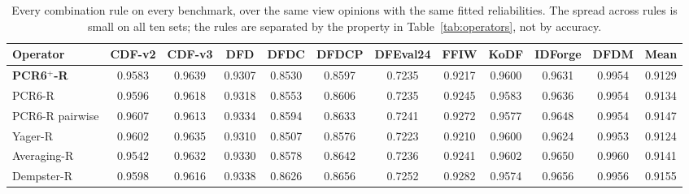\begin{table}[t]
\centering
\caption{Every combination rule on every benchmark, over the same view opinions with the same fitted reliabilities. The spread across rules is small on all ten sets; the rules are separated by the property in Table~\ref{tab:operators}, not by accuracy.}
\label{tab:operatorsfull}
\setlength{\tabcolsep}{4pt}
\small
\begin{tabular}{lccccccccccc}
\toprule
Operator & CDF-v2 & CDF-v3 & DFD & DFDC & DFDCP & DFEval24 & FFIW & KoDF & IDForge & DFDM & Mean \\
\midrule
\textbf{PCR6$^+$-R} & 0.9583 & 0.9639 & 0.9307 & 0.8530 & 0.8597 & 0.7235 & 0.9217 & 0.9600 & 0.9631 & 0.9954 & 0.9129 \\
PCR6-R & 0.9596 & 0.9618 & 0.9318 & 0.8553 & 0.8606 & 0.7235 & 0.9245 & 0.9583 & 0.9636 & 0.9954 & 0.9134 \\
PCR6-R pairwise & 0.9607 & 0.9613 & 0.9334 & 0.8594 & 0.8633 & 0.7241 & 0.9272 & 0.9577 & 0.9648 & 0.9954 & 0.9147 \\
Yager-R & 0.9602 & 0.9635 & 0.9310 & 0.8507 & 0.8576 & 0.7223 & 0.9210 & 0.9600 & 0.9624 & 0.9953 & 0.9124 \\
Averaging-R & 0.9542 & 0.9632 & 0.9330 & 0.8578 & 0.8642 & 0.7236 & 0.9241 & 0.9602 & 0.9650 & 0.9960 & 0.9141 \\
Dempster-R & 0.9598 & 0.9616 & 0.9338 & 0.8626 & 0.8656 & 0.7252 & 0.9282 & 0.9574 & 0.9656 & 0.9956 & 0.9155 \\
\bottomrule
\end{tabular}
\end{table}
